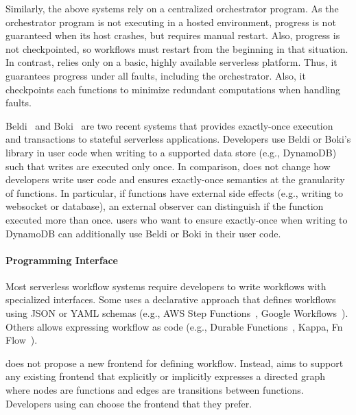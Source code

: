 Similarly, the above systems rely on a centralized orchestrator program. As
the orchestrator program is not executing in a hosted environment, 
progress is not guaranteed when its host crashes, but requires manual restart.
Also, progress is not checkpointed, so workflows must restart from the beginning in that situation.
In contrast, \name{} relies only on a basic, highly available serverless platform. Thus, 
it guarantees progress under all faults, including the orchestrator.
 Also, it checkpoints each functions to minimize
redundant computations when handling faults.

Beldi~\cite{beldi} and Boki~\cite{boki} are two recent systems that provides
exactly-once execution and transactions to stateful serverless applications.
Developers use Beldi or Boki's library in user code when writing to a
supported data store (e.g., DynamoDB) such that writes are executed only once.
In comparison, \name{} does not change how developers write user code and
ensures exactly-once semantics at the granularity of functions. In particular,
if functions have external side effects (e.g., writing to websocket or
database), an external observer can distinguish if the function executed more
than once. \name{} users who want to ensure exactly-once when writing to
DynamoDB can additionally use Beldi or Boki in their user code.

\paragraph{Programming Interface}

Most serverless workflow systems require developers to write workflows with
specialized interfaces. Some uses a declarative approach that defines
workflows using JSON or YAML schemas (e.g., AWS Step
Functions~\cite{aws-step-functions}, Google
Workflows~\cite{google-workflows}). Others allows expressing workflow as code
(e.g., Durable Functions~\cite{durable-functions}, Kappa\cite{kappa}, Fn
Flow~\cite{fn-flow}).

\name{} does not propose a new frontend for defining workflow. Instead,
\name{} aims to support any existing frontend that explicitly or implicitly
expresses a directed graph where nodes are functions and edges are transitions
between functions. Developers using \name{} can choose the frontend that they
prefer.




